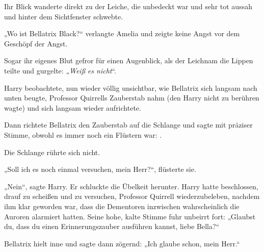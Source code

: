 Ihr Blick wanderte direkt zu der Leiche, die unbedeckt war und sehr tot aussah und hinter dem Sichtfenster schwebte.

„Wo ist Bellatrix Black?“ verlangte Amelia und zeigte keine Angst vor dem Geschöpf der Angst.

Sogar ihr eigenes Blut gefror für einen Augenblick, als der Leichnam die Lippen teilte und gurgelte: „\emph{Weiß} \emph{es nicht}“.

\later

Harry beobachtete, nun wieder völlig unsichtbar, wie Bellatrix sich langsam nach unten beugte, Professor Quirrells Zauberstab nahm (den Harry nicht zu berühren wagte) und sich langsam wieder aufrichtete.

Dann richtete Bellatrix den Zauberstab auf die Schlange und sagte mit präziser Stimme, obwohl es immer noch ein Flüstern war: .

Die Schlange rührte sich nicht.

„Soll ich es noch einmal versuchen, mein Herr?“, flüsterte sie.

„Nein“, sagte Harry. Er schluckte die Übelkeit herunter. Harry hatte beschlossen, drauf zu scheißen und zu versuchen, Professor Quirrell wiederzubeleben, nachdem ihm klar geworden war, dass die Dementoren inzwischen wahrscheinlich die Auroren alarmiert hatten. Seine hohe, kalte Stimme fuhr unbeirrt fort: „Glaubst du, dass du einen Erinnerungszauber ausführen kannst, liebe Bella?“

Bellatrix hielt inne und sagte dann zögernd: „Ich glaube schon, mein Herr.“

